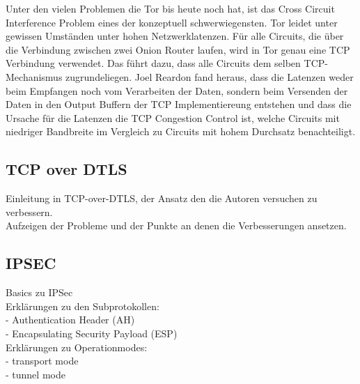 \documentclass[fleqn,envcountsame,runningheads,10pt,a4paper]{llncs}
\begin{document}
Unter den vielen Problemen die Tor bis heute noch hat, ist das Cross Circuit Interference Problem eines der konzeptuell schwerwiegensten.\cite{tor_improvements} Tor leidet unter gewissen Umständen unter hohen Netzwerklatenzen. Für alle Circuits, die über die Verbindung zwischen zwei Onion Router laufen, wird in Tor genau eine TCP Verbindung verwendet. Das führt dazu, dass alle Circuits dem selben TCP-Mechanismus zugrundeliegen. Joel Reardon fand heraus, dass die Latenzen weder beim Empfangen noch vom Verarbeiten der Daten, sondern beim Versenden der Daten in den Output Buffern der TCP Implementiereung entstehen und dass die Ursache für die Latenzen die TCP Congestion Control ist, welche Circuits mit niedriger Bandbreite im Vergleich zu Circuits mit hohem Durchsatz benachteiligt.\cite{tcp-over-dtls-thesis,tcp-over-dtls}






\begin{figure}[htpc]
\end{figure} 

\subsection{TCP over DTLS}
\label{sec:DTLSrealtedwork}

Einleitung in TCP-over-DTLS, der Ansatz den die Autoren versuchen zu verbessern. \\
Aufzeigen der Probleme und der Punkte an denen die Verbesserungen ansetzen.\\

\subsection{IPSEC}
\label{sec:ipsec}

Basics zu IPSec\\
Erklärungen zu den Subprotokollen:\\
- Authentication Header (AH)\\
- Encapsulating Security Payload (ESP)\\
Erklärungen zu Operationmodes:\\
- transport mode\\
- tunnel mode\\
\end{document}
